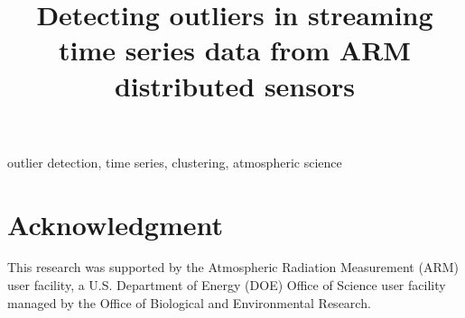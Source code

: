 \documentclass[conference]{IEEEtran}
\begin{document}
\title{Detecting outliers in streaming time series data from ARM distributed sensors
}

\author{
\and
{}
\and
{}
\and
{}
}
\maketitle



\begin{IEEEkeywords}
outlier detection, time series, clustering, atmospheric science
\end{IEEEkeywords}











\section*{Acknowledgment}
This research was supported by the Atmospheric Radiation Measurement (ARM) user 
facility, a U.S. Department of Energy (DOE) Office of Science user facility 
managed by the Office of Biological and Environmental Research.


 

\end{document}

